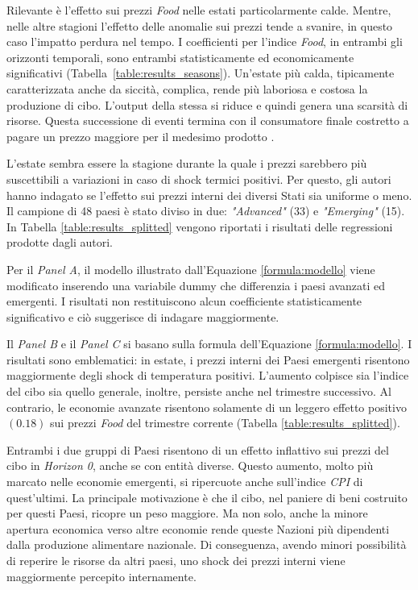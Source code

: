 Rilevante è l'effetto sui prezzi \textit{Food} nelle estati particolarmente calde. Mentre, nelle altre stagioni l'effetto delle anomalie sui prezzi tende a svanire, in questo caso l'impatto perdura nel tempo. I coefficienti per l'indice \textit{Food}, in entrambi gli orizzonti temporali, sono entrambi statisticamente ed economicamente significativi (Tabella~\ref{table:results_seasons}). Un'estate più calda, tipicamente caratterizzata anche da siccità, complica, rende più laboriosa e costosa la produzione di cibo. L'output della stessa si riduce e quindi genera una scarsità di risorse. Questa successione di eventi termina con il consumatore finale costretto a pagare un prezzo maggiore per il medesimo prodotto \parencite{ECB:feeling_heat}. 

L'estate sembra essere la stagione durante la quale i prezzi sarebbero più suscettibili a variazioni in caso di shock termici positivi. Per questo, gli autori hanno indagato se l'effetto sui prezzi interni dei diversi Stati sia uniforme o meno. Il campione di 48 paesi è stato diviso in due: \textit{"Advanced"} (33) e \textit{"Emerging"} (15). In Tabella \ref{table:results_splitted} vengono riportati i risultati delle regressioni prodotte dagli autori.

Per il \textit{Panel A}, il modello illustrato dall'Equazione \ref{formula:modello} viene modificato inserendo una variabile dummy che differenzia i paesi avanzati ed emergenti. I risultati non restituiscono alcun coefficiente statisticamente significativo e ciò suggerisce di indagare maggiormente.

Il \textit{Panel B} e il \textit{Panel C} si basano sulla formula dell'Equazione \ref{formula:modello}. I risultati sono emblematici: in estate, i prezzi interni dei Paesi emergenti risentono maggiormente degli shock di temperatura positivi. L'aumento colpisce sia l'indice del cibo sia quello generale, inoltre, persiste anche nel trimestre successivo. Al contrario, le economie avanzate risentono solamente di un leggero effetto positivo $(0.18)$ sui prezzi \textit{Food} del trimestre corrente (Tabella \ref{table:results_splitted}).

Entrambi i due gruppi di Paesi risentono di un effetto inflattivo sui prezzi del cibo in \textit{Horizon 0}, anche se con entità diverse. Questo aumento, molto più marcato nelle economie emergenti, si ripercuote anche sull'indice \textit{CPI} di quest'ultimi. La principale motivazione è che il cibo, nel paniere di beni costruito per questi Paesi, ricopre un peso maggiore. Ma non solo, anche la minore apertura economica verso altre economie rende queste Nazioni più dipendenti dalla produzione alimentare nazionale. Di conseguenza, avendo minori possibilità di reperire le risorse da altri paesi, uno shock dei prezzi interni viene maggiormente percepito internamente.

